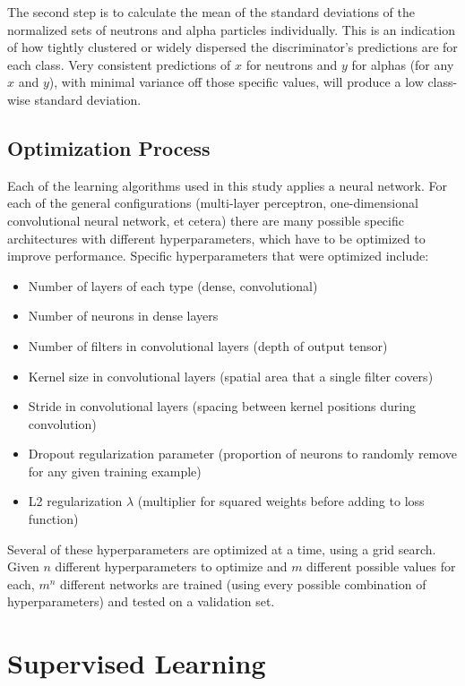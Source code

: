 \documentclass[10pt]{article}
\begin{document}
The second step is to calculate the mean of the standard deviations of the normalized sets of neutrons and alpha particles individually. This is an indication of how tightly clustered or widely dispersed the discriminator’s predictions are for each class. Very consistent predictions of $x$ for neutrons and $y$ for alphas (for any $x$ and $y$), with minimal variance off those specific values, will produce a low class-wise standard deviation.

\subsection{Optimization Process}

Each of the learning algorithms used in this study applies a neural network. For each of the general configurations (multi-layer perceptron, one-dimensional convolutional neural network, et cetera) there are many possible specific architectures with different hyperparameters, which have to be optimized to improve performance. Specific hyperparameters that were optimized include:

\begin{itemize}
    \item Number of layers of each type (dense, convolutional)
    \item Number of neurons in dense layers
    \item Number of filters in convolutional layers (depth of output tensor)
    \item Kernel size in convolutional layers (spatial area that a single filter covers)
    \item Stride in convolutional layers (spacing between kernel positions during convolution)
    \item Dropout regularization parameter (proportion of neurons to randomly remove for any given training example)
    \item L2 regularization $\lambda$ (multiplier for squared weights before adding to loss function)
\end{itemize}

Several of these hyperparameters are optimized at a time, using a grid search. Given $n$ different hyperparameters to optimize and $m$ different possible values for each, $m^n$ different networks are trained (using every possible combination of hyperparameters) and tested on a validation set.

\section{Supervised Learning}
\end{document}
